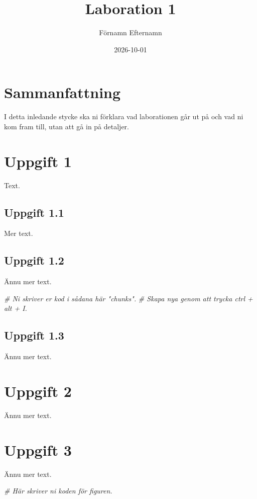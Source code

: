 \documentclass[
]{article}
\title{Laboration 1}
\author{Förnamn Efternamn}
\date{2026-10-01}
\newenvironment{Shaded}{\begin{snugshade}}{\end{snugshade}}
\newcommand{\CommentTok}[1]{\textcolor[rgb]{0.56,0.35,0.01}{\textit{#1}}}
\begin{document}
\maketitle

\renewcommand{\figurename}{Figur} 
\renewcommand{\tablename}{Tabell}

\section{Sammanfattning}\label{sammanfattning}

I detta inledande stycke ska ni förklara vad laborationen går ut på och
vad ni kom fram till, utan att gå in på detaljer.

\section{Uppgift 1}\label{uppgift-1}

Text.

\subsection{Uppgift 1.1}\label{uppgift-1.1}

Mer text.

\subsection{Uppgift 1.2}\label{uppgift-1.2}

Ännu mer text.

\begin{Shaded}
\begin{Highlighting}[]
\CommentTok{\# Ni skriver er kod i sådana här "chunks". }
\CommentTok{\# Skapa nya genom att trycka ctrl + alt + I.}
\end{Highlighting}
\end{Shaded}

\subsection{Uppgift 1.3}\label{uppgift-1.3}

Ännu mer text.

\section{Uppgift 2}\label{uppgift-2}

Ännu mer text.

\section{Uppgift 3}\label{uppgift-3}

Ännu mer text.

\begin{Shaded}
\begin{Highlighting}[]
\CommentTok{\# Här skriver ni koden för figuren.}
\end{Highlighting}
\end{Shaded}
\end{document}
